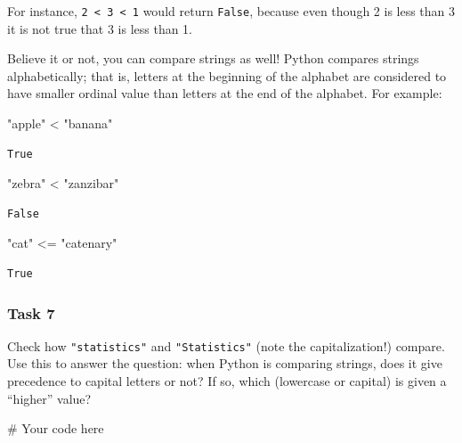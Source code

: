 \documentclass[
  11pt,
]{article}
\newenvironment{Shaded}{\begin{snugshade}}{\end{snugshade}}
\newcommand{\CommentTok}[1]{\textcolor[rgb]{0.37,0.37,0.37}{#1}}
\newcommand{\OperatorTok}[1]{\textcolor[rgb]{0.37,0.37,0.37}{#1}}
\newcommand{\StringTok}[1]{\textcolor[rgb]{0.13,0.47,0.30}{#1}}
\begin{document}
For instance, \texttt{2\ \textless{}\ 3\ \textless{}\ 1} would return
\texttt{False}, because even though 2 is less than 3 it is not true that
3 is less than 1.

Believe it or not, you can compare strings as well! Python compares
strings alphabetically; that is, letters at the beginning of the
alphabet are considered to have smaller ordinal value than letters at
the end of the alphabet. For example:

\begin{Shaded}
\begin{Highlighting}[]
\CommentTok{"apple"} \OperatorTok{\textless{}} \StringTok{"banana"}
\end{Highlighting}
\end{Shaded}

\begin{verbatim}
True
\end{verbatim}

\begin{Shaded}
\begin{Highlighting}[]
\CommentTok{"zebra"} \OperatorTok{\textless{}} \StringTok{"zanzibar"}
\end{Highlighting}
\end{Shaded}

\begin{verbatim}
False
\end{verbatim}

\begin{Shaded}
\begin{Highlighting}[]
\CommentTok{"cat"} \OperatorTok{\textless{}=} \StringTok{"catenary"}
\end{Highlighting}
\end{Shaded}

\begin{verbatim}
True
\end{verbatim}

\subsubsection{Task 7}\label{task-7}

Check how \texttt{"statistics"} and \texttt{"Statistics"} (note the
capitalization!) compare. Use this to answer the question: when Python
is comparing strings, does it give precedence to capital letters or not?
If so, which (lowercase or capital) is given a ``higher'' value?

\begin{Shaded}
\begin{Highlighting}[]
\CommentTok{\# Your code here}
\end{Highlighting}
\end{Shaded}
\end{document}
